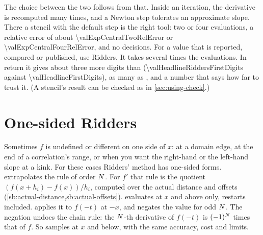 The choice between the two follows from that. Inside an iteration, the derivative is recomputed many times, and a
Newton step tolerates an approximate slope. There a stencil with the default step is the right tool: two or four
evaluations, a relative error of about \num{\valExpCentralTwoRelError} or \num{\valExpCentralFourRelError}, and no
decisions. For a value that is reported, compared or published, use Ridders. It takes several times the
evaluations. In return it gives about three more digits than  (\num{\valHeadlineRiddersFirstDigits}
against \num{\valHeadlineFirstDigits}), as many as , and a number that says how far to trust it. (A
stencil's result can be checked as in \cref{sec:using-check}.)

\section{One-sided Ridders}\label{sec:ridders-onesided}

\begin{marginfigure}
\centering

\caption{The one-sided form for $\log x$ at $x = 2^{-k}$, from its default initial step. Solid: the relative error.
Dashed: the estimate over the value returned. Both are for $f'$ (dark) and $f''''$ (accent). Dotted: central
Ridders' error for $f'$. Each keeps its accuracy for some halvings after all its evaluations are spent (the line,
for $f'$). Then the one-sided error rises towards 1, covered for a while. Further out, to the end of the study, the
dashed curve is above the line at $1/4$: the result is flagged. At one distance, for $f'$ (the circle), it is
neither covered nor flagged. Central Ridders is more accurate, and returns no value beyond
$k = \num{\valRiddersEdgeLimitExponent}$.\label{fig:ridders-onesided-reach}}
\end{marginfigure}

Sometimes $f$ is undefined or different on one side of $x$: at a domain edge, at the end of a correlation's range,
or when you want the right-hand or the left-hand slope at a kink. For these cases Ridders' method has one-sided
forms.  extrapolates the  rule of order $N$. For $f'$ that rule is the
quotient $(f(x + h_i) - f(x)) / h_i$, computed over the actual distance and offsets
(\cref{sb:actual-distance,sb:actual-offsets}).  evaluates  at $x$ and above only,
restarts included.  applies it to $f(-t)$ at $-x$, and negates the value for odd $N$. The
negation undoes the chain rule: the $N$-th derivative of $f(-t)$ is $(-1)^{N}$ times that of $f$. So
 samples at $x$ and below, with the same accuracy, cost and limits.


